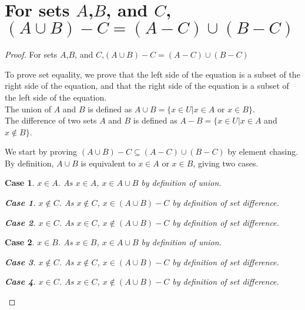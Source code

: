 \documentclass[12pt]{article}
\newtheorem{case}{Case}
\newtheorem{subcase}{Case}
\numberwithin{subcase}{case}
\begin{document}
\section*{For sets $A$,$B$, and $C$,$(A\cup B) - C = (A - C) \cup (B - C)$}
\begin{proof} %

For sets $A$,$B$, and $C$,$(A\cup B) - C = (A - C) \cup (B - C)$

To prove set equality, we prove that the left side of the equation is a subset of the right side of the
equation, and that the right side of the equation is a subset of the left side of the equation.\\
The union of $A$ and $B$ is defined as $A \cup B = \{ x \in U | x \in A$ or $x \in B\}$.\\
The difference of two sets $A$ and $B$ is defined as $A - B = \{x \in U | x \in A$ and $x \not\in B\}$.

We start by proving $(A\cup B) - C \subseteq (A - C) \cup (B - C)$ by element chasing.
By definition, $A \cup B$ is equivalent to $x \in A$ or $x \in B$, giving two cases.
\begin{case}
$x \in A$. As $x \in A$, $x \in A \cup B$ by definition of union.
  \begin{subcase}
    $x \not\in C$. As $x \not\in C$, $x \in (A\cup B) - C$ by definition of set difference.
  \end{subcase}
  \begin{subcase}
    $x \in C$. As $x \in C$, $x \not\in (A \cup B) - C$ by definition of set difference.
  \end{subcase}
\end{case}
\begin{case}
  $x \in B$. As $x \in B$, $x \in A \cup B$ by definition of union.
  \begin{subcase}
    $x \not\in C$. As $x \not\in C$, $x \in (A\cup B) - C$ by definition of set difference.
  \end{subcase}
  \begin{subcase}
    $x \in C$. As $x \in C$, $x \not\in (A \cup B) - C$ by definition of set difference.
  \end{subcase}
\end{case}


\end{proof}
\end{document}

